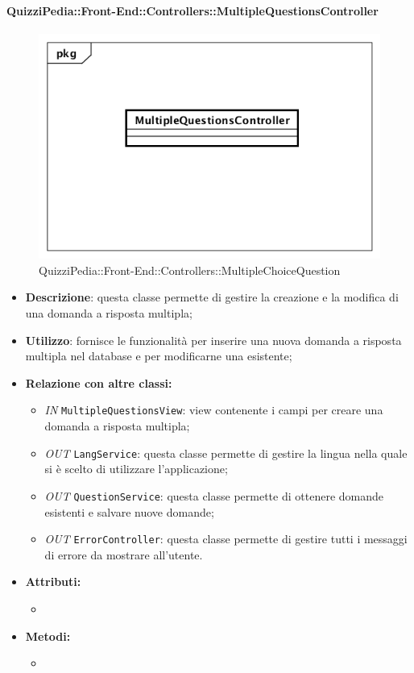 \paragraph{QuizziPedia::Front-End::Controllers::MultipleQuestionsController}
\begin{figure}
	\centering
	\includegraphics[scale=0.45]{UML/Classi/Front-End/QuizziPedia_Front-end_Controller_MultipleQuestionsController.png}
	\caption{QuizziPedia::Front-End::Controllers::MultipleChoiceQuestion}
\end{figure}
\begin{itemize}
	\item \textbf{Descrizione}: questa classe permette di gestire la creazione e la modifica di una domanda a risposta multipla;
	\item \textbf{Utilizzo}: fornisce le funzionalità per inserire una nuova domanda a risposta multipla nel database e per modificarne una esistente;
	\item \textbf{Relazione con altre classi:}
	\begin{itemize}
		\item \textit{IN} \texttt{MultipleQuestionsView}: view contenente i campi per creare una domanda a risposta multipla;  
		\item \textit{OUT} \texttt{LangService}: questa classe permette di gestire la lingua nella quale si è scelto di utilizzare l'applicazione;
		\item \textit{OUT} \texttt{QuestionService}: questa classe permette di ottenere domande esistenti e salvare nuove domande;
		\item \textit{OUT} \texttt{ErrorController}: questa classe permette di gestire tutti i messaggi di errore da mostrare all'utente.
	\end{itemize}
	\item \textbf{Attributi:}
	\begin{itemize}
		\item 
	\end{itemize}
	\item \textbf{Metodi:}
	\begin{itemize}
		\item 
	\end{itemize}
\end{itemize}

